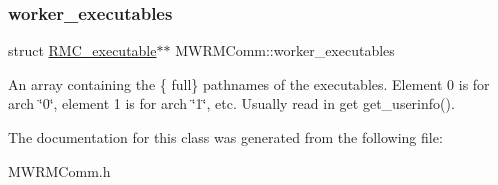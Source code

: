 \subsubsection{\texorpdfstring{worker\+\_\+executables}{worker\_executables}}
{\footnotesize\ttfamily struct \hyperlink{structRMC__executable}{R\+M\+C\+\_\+executable}$\ast$$\ast$ M\+W\+R\+M\+Comm\+::worker\+\_\+executables\hspace{0.3cm}{\ttfamily [protected]}}

An array containing the \{ full\} pathnames of the executables. Element 0 is for arch \char`\"{}0\char`\"{}, element 1 is for arch \char`\"{}1\char`\"{}, etc. Usually read in get get\+\_\+userinfo(). 

The documentation for this class was generated from the following file\+:\begin{DoxyCompactItemize}
\item 
M\+W\+R\+M\+Comm.\+h\end{DoxyCompactItemize}
